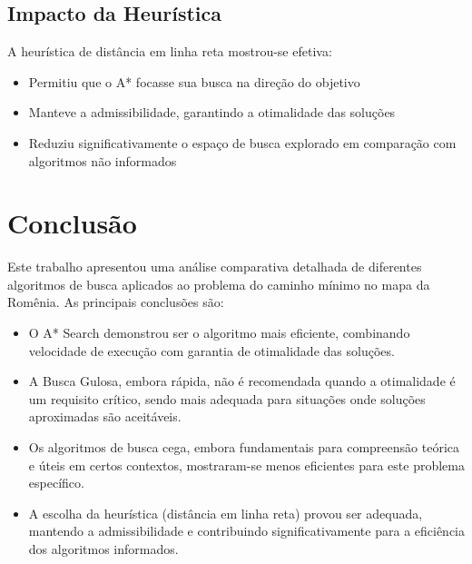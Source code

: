 \documentclass[12pt,a4paper]{article}
\begin{document}
\subsection{Impacto da Heurística}
A heurística de distância em linha reta mostrou-se efetiva:

\begin{itemize}
    \item Permitiu que o A* focasse sua busca na direção do objetivo
    \item Manteve a admissibilidade, garantindo a otimalidade das soluções
    \item Reduziu significativamente o espaço de busca explorado em comparação com algoritmos não informados
\end{itemize}

\section{Conclusão}

Este trabalho apresentou uma análise comparativa detalhada de diferentes algoritmos de busca aplicados ao problema do caminho mínimo no mapa da Romênia. As principais conclusões são:

\begin{itemize}
    \item O A* Search demonstrou ser o algoritmo mais eficiente, combinando velocidade de execução com garantia de otimalidade das soluções.
    
    \item A Busca Gulosa, embora rápida, não é recomendada quando a otimalidade é um requisito crítico, sendo mais adequada para situações onde soluções aproximadas são aceitáveis.
    
    \item Os algoritmos de busca cega, embora fundamentais para compreensão teórica e úteis em certos contextos, mostraram-se menos eficientes para este problema específico.
    
    \item A escolha da heurística (distância em linha reta) provou ser adequada, mantendo a admissibilidade e contribuindo significativamente para a eficiência dos algoritmos informados.
\end{itemize}
\end{document}
